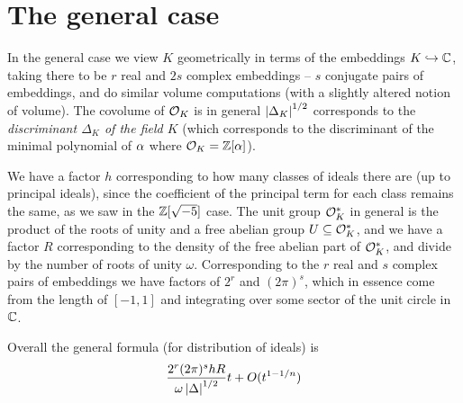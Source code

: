 \documentclass[11pt]{article}
\begin{document}
\section{The general case}
In the general case we view $K$ geometrically in terms of the embeddings $K \hookrightarrow \mathbb{C}$, taking there to be $r$ real and $2s$ complex embeddings -- $s$ conjugate pairs of embeddings, and do similar volume computations (with a slightly altered notion of volume). The covolume of $\mathcal{O}_K$ is in general $\left| \Delta_K \right|^{1/2}$ corresponds to the \emph{discriminant $\Delta_K$ of the field $K$} (which corresponds to the discriminant of the minimal polynomial of $\alpha$ where $\mathcal{O}_K = \mathbb{Z}[\alpha]$). 

We have a factor $h$ corresponding to how many classes of ideals there are (up to principal ideals), since the coefficient of the principal term for each class remains the same, as we saw in the $\mathbb{Z}[\sqrt{-5}]$ case. The unit group $\mathcal{O}_K^*$ in general is the product of the roots of unity and a free abelian group $U \subseteq \mathcal{O}_K^*$, and we have a factor $R$ corresponding to the density of the free abelian part of $\mathcal{O}_K^*$, and divide by the number of roots of unity $\omega$. Corresponding to the $r$ real and $s$ complex pairs of embeddings we have factors of $2^r$ and $(2\pi)^s$, which in essence come from the length of $[-1, 1]$ and integrating over some sector of the unit circle in $\mathbb{C}$.

Overall the general formula (for distribution of ideals) is
$$
    \frac{2^r(2\pi)^shR}{\omega\left| \Delta \right|^{1/2}}t + O(t^{1 - 1/n})
$$
\end{document}
